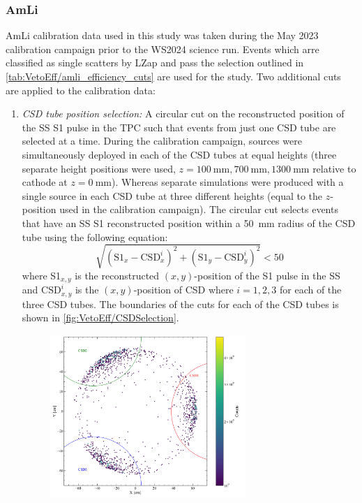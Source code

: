 \subsubsection{AmLi}\label{sec:VetoEff/AmLi_Efficiency}
AmLi calibration data used in this study was taken during the May 2023 calibration campaign prior to the WS2024 science run. Events which arre classified as single scatters by LZap and pass the selection outlined in \autoref{tab:VetoEff/amli_efficiency_cuts} are used for the study. Two additional cuts are applied to the calibration data:
\begin{enumerate}
	\item \textit{CSD tube position selection:} A circular cut on the reconstructed position of the SS S1 pulse in the TPC such that events from just one CSD tube are selected at a time. During the calibration campaign, sources were simultaneously deployed in each of the CSD tubes at equal heights (three separate height positions were used, $z=100~\text{mm},700~\text{mm},1300~\text{mm}$ relative to cathode at $z=0~\text{mm}$). Whereas separate simulations were produced with a single source in each CSD tube at three different heights (equal to the $z$-position used in the calibration campaign). 
    The circular cut selects events that have an SS S1 reconstructed position within a 50~mm radius of the CSD tube using the following equation:
    \begin{equation}\label{eqn:VetoEff/CSDSelection}
        \sqrt{(\text{S1}_x-\text{CSD}_x^i)^2+(\text{S1}_y-\text{CSD}_y^i)^2}<50
    \end{equation}
    where S1$_{x,y}$ is the reconstructed $(x,y)$-position of the S1 pulse in the SS and $\text{CSD}_{x,y}^i$ is the $(x,y)$-position of CSD where $i=1,2,3$ for each of the three CSD tubes.
    The boundaries of the cuts for each of the CSD tubes is shown in \autoref{fig:VetoEff/CSDSelection}. 
    \begin{figure}[!ht]
    \centering
        \includegraphics[width=0.7\textwidth]{figures/VetoEfficiency/CircularCSDCut.pdf}

\end{figure}
\end{enumerate}
